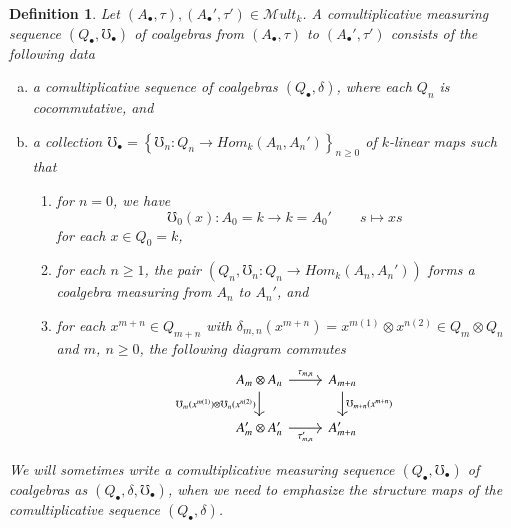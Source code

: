\documentclass[10pt, colorlinks]{article}
\numberwithin{equation}{section} \DeclareMathSizes{2}{10}{12}{13}
\newtheorem{defn}[thm]{Definition}
\begin{document}
     \begin{defn}\label{def6.6}
            Let $(A_\bullet,\tau),(A_\bullet',\tau')\in \mathscr Mult_k$. A comultiplicative measuring sequence $(Q_\bullet,\mho_\bullet)$ of coalgebras  from $(A_\bullet,\tau)$ to $(A_\bullet',\tau')$ consists of the following data
            \begin{enumerate}[(a)]
                \item a comultiplicative sequence of coalgebras $(Q_\bullet,\delta)$, where each $Q_n$ is cocommutative, and
                \item a collection $\mho_\bullet=\left\{\mho_n:Q_n\longrightarrow  {Hom}_k(A_n,A_n')\right\}_{n\geq 0}$ of $k$-linear maps such that
                \begin{enumerate}[(1)]
                    \item for $n=0$, we have
                    \begin{equation}
                        \mho_0(x):A_0=k\longrightarrow k=A_0'\qquad s\longmapsto  xs
                    \end{equation} for each $x\in Q_0=k$,
                    \item   for each $n\geq 1$, the pair $(Q_n,\mho_n:Q_n\longrightarrow  {Hom}_k(A_n,A_n'))$ forms a coalgebra measuring from $A_n$ to $A_n'$, and
                    \item for each $x^{m+n}\in Q_{m+n}$ with $\delta_{m,n}(x^{m+n})=x^{m(1)}\otimes x^{n(2)}\in Q_m\otimes Q_n$ and $m$, $n\geq 0$, the following diagram commutes
                    \begin{equation}\label{diag6.4}
                \begin{tikzcd}
                A_m \otimes A_n
                \arrow[r, "\tau_{m,n}"]
                \arrow[d, "\mho_m(x^{m(1)})\otimes\mho_{n}(x^{n(2)})"']
                &A_{m+n}
                \arrow[d, "\mho_{m+n}(x^{m+n})"]\\
                A_m'\otimes A_{n}' \arrow[r, "\tau_{m,n}'"']
                &A'_{m+n}
            \end{tikzcd}
            \end{equation}
 
                \end{enumerate}    
            \end{enumerate}
We will sometimes write  a comultiplicative measuring sequence $(Q_\bullet,\mho_\bullet)$ of coalgebras as $(Q_\bullet,\delta,\mho_\bullet)$, when we need to emphasize the structure maps of the comultiplicative sequence $(Q_\bullet,\delta)$. 
        \end{defn}
\end{document}
